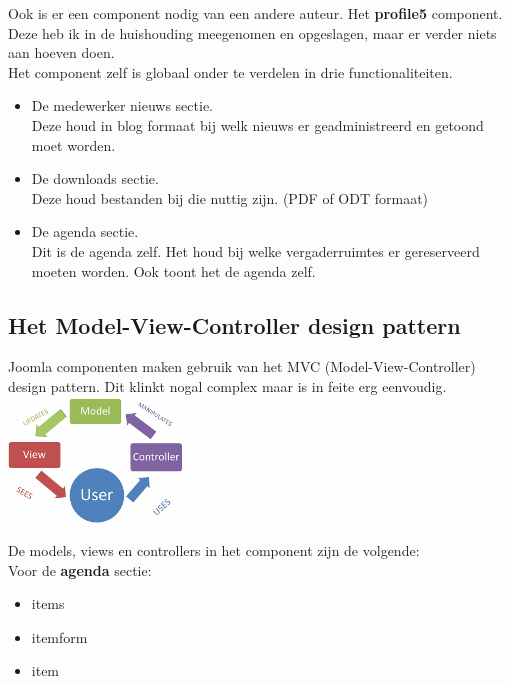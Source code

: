 \documentclass{article}
\begin{document}
Ook is er een component nodig van een andere auteur. Het \textbf{profile5} component. Deze heb ik in de huishouding meegenomen en opgeslagen, maar er verder niets aan hoeven doen. \\

Het component zelf is globaal onder te verdelen in drie functionaliteiten. \\
\begin{itemize}
\item De medewerker nieuws sectie. \\
Deze houd in blog formaat bij welk nieuws er geadministreerd en getoond moet worden.
\item De downloads sectie. \\
Deze houd bestanden bij die nuttig zijn. (PDF of ODT formaat)
\item De agenda sectie.\\
Dit is de agenda zelf. Het houd bij welke vergaderruimtes er gereserveerd moeten worden. Ook toont het de agenda zelf.
\end{itemize}

\newpage
\subsection{Het Model-View-Controller design pattern}

Joomla componenten maken gebruik van het MVC (Model-View-Controller) design pattern. Dit klinkt nogal complex maar is in feite erg eenvoudig. \\

\includegraphics{mvc}

\bigskip
De models, views en controllers in het component zijn de volgende: \\

Voor de \textbf{agenda} sectie: \\

\begin{itemize}
\item items
\item itemform
\item item
\end{itemize}
\end{document}
